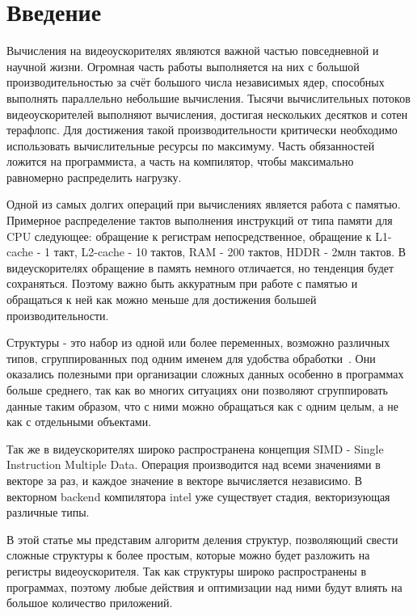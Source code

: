 \section{Введение}
\label{sec:Introduction}
Вычисления на видеоускорителях являются важной частью повседневной и научной жизни. Огромная часть работы выполняется на них с большой производительностью за счёт большого числа независимых ядер, способных выполнять параллельно небольшие вычисления. Тысячи вычислительных потоков видеоускорителей выполняют вычисления, достигая нескольких десятков и сотен терафлопс. Для достижения такой производительности критически необходимо использовать вычислительные ресурсы по максимуму. Часть обязанностей ложится на программиста, а часть на компилятор, чтобы максимально равномерно распределить нагрузку.

Одной из самых долгих операций при вычислениях является работа с памятью. Примерное распределение тактов выполнения инструкций от типа памяти для CPU следующее: обращение к регистрам непосредственное, обращение к L1-cache - 1 такт, L2-cache - 10 тактов, RAM - 200 тактов, HDDR - 2млн тактов. В видеускорителях обращение в память немного отличается, но тенденция будет сохраняться. Поэтому важно быть аккуратным при работе с памятью и обращаться к ней как можно меньше для достижения большей производительности.

Структуры - это набор из одной или более переменных, возможно различных типов, сгруппированных под одним именем для удобства обработки~\cite{Kern}. Они оказались полезными при организации сложных данных особенно в программах больше среднего, так как во многих ситуациях они позволяют сгруппировать данные таким образом, что с ними можно обращаться как с одним целым, а не как с отдельными объектами.

Так же в видеускорителях широко распространена концепция SIMD - Single Instruction Multiple Data. Операция производится над всеми значениями в векторе за раз, и каждое значение в векторе вычисляется независимо. В векторном backend компилятора intel уже существует стадия, векторизующая различные типы.

В этой статье мы представим алгоритм деления структур, позволяющий свести сложные структуры к более простым, которые можно будет разложить на регистры видеоускорителя. Так как структуры широко распространены в программах, поэтому любые действия и оптимизации над ними будут влиять на большое количество приложений.
